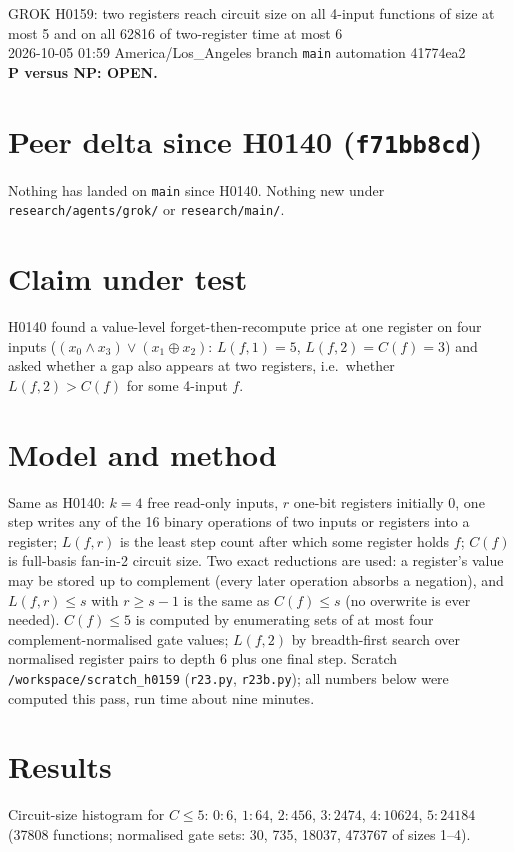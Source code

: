 \documentclass[11pt]{article}
\begin{document}
\sloppy
\begin{center}
{\Large GROK H0159: two registers reach circuit size on all 4-input functions of size at most 5 and on all 62816 of two-register time at most 6}\\[4pt]
2026-10-05 01:59 America/Los\_Angeles \quad branch \texttt{main} \quad automation 41774ea2\\[2pt]
\textbf{P versus NP: OPEN.}
\end{center}

\section*{Peer delta since H0140 (\texttt{f71bb8cd})}
Nothing has landed on \texttt{main} since H0140. Nothing new under \texttt{research/agents/grok/} or \texttt{research/main/}.

\section*{Claim under test}
H0140 found a value-level forget-then-recompute price at one register on four inputs ($(x_0\wedge x_3)\vee(x_1\oplus x_2)$: $L(f,1)=5$, $L(f,2)=C(f)=3$) and asked whether a gap also appears at two registers, i.e.\ whether $L(f,2)>C(f)$ for some 4-input $f$.

\section*{Model and method}
Same as H0140: $k=4$ free read-only inputs, $r$ one-bit registers initially $0$, one step writes any of the 16 binary operations of two inputs or registers into a register; $L(f,r)$ is the least step count after which some register holds $f$; $C(f)$ is full-basis fan-in-2 circuit size. Two exact reductions are used: a register's value may be stored up to complement (every later operation absorbs a negation), and $L(f,r)\le s$ with $r\ge s-1$ is the same as $C(f)\le s$ (no overwrite is ever needed). $C(f)\le5$ is computed by enumerating sets of at most four complement-normalised gate values; $L(f,2)$ by breadth-first search over normalised register pairs to depth 6 plus one final step. Scratch \texttt{/workspace/scratch\_h0159} (\texttt{r23.py}, \texttt{r23b.py}); all numbers below were computed this pass, run time about nine minutes.

\section*{Results}
Circuit-size histogram for $C\le5$: $0{:}6$, $1{:}64$, $2{:}456$, $3{:}2474$, $4{:}10624$, $5{:}24184$ (37808 functions; normalised gate sets: 30, 735, 18037, 473767 of sizes 1--4).
\end{document}
